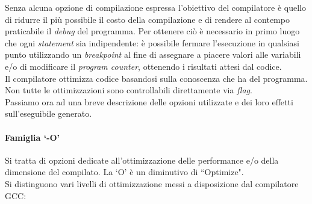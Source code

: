 Senza alcuna opzione di compilazione espressa l'obiettivo del compilatore è 
quello di ridurre il più possibile il costo della compilazione e di rendere al 
contempo praticabile il \emph{debug} del programma. Per ottenere ciò è 
necessario in primo luogo che ogni \emph{statement} sia indipendente: è 
possibile fermare l'esecuzione in qualsiasi punto utilizzando un 
\emph{breakpoint} al fine di assegnare a piacere valori alle variabili e/o di 
modificare il \emph{program counter}, ottenendo i risultati attesi dal codice.\\

Il compilatore ottimizza codice basandosi sulla conoscenza che ha del 
programma. Non tutte le ottimizzazioni sono controllabili direttamente via 
\emph{flag}. \\

Passiamo ora ad una breve descrizione delle opzioni utilizzate e dei loro 
effetti sull'eseguibile generato.

\paragraph{Famiglia `-O' \\}
Si tratta di opzioni dedicate all'ottimizzazione delle performance e/o della 
dimensione del compilato. La `O' è un diminutivo di ``Optimize".\\
Si distinguono vari livelli di ottimizzazione messi a disposizione dal 
compilatore GCC:

